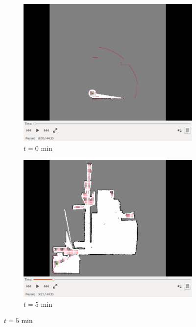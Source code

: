 \documentclass[smallextended]{svjour3}       %
\begin{document}
\begin{figure}[!ht]
    \centering
    \begin{subfigure}[t]{0.3\columnwidth}
        \centering
        \includegraphics[trim = {4.6cm 3.8cm 4.6cm 0}, clip, width=\textwidth]{0min.png}
        \caption{$t=0$ min}
        \label{fig:IRL0min}
    \end{subfigure}
    \begin{subfigure}[t]{0.3\columnwidth}
        \centering
        \includegraphics[trim = {4.6cm 3.8cm 4.6cm 0}, clip, width=\textwidth]{5min.png}
        \caption{$t=5$ min}
        \label{fig:IRL5min}

\end{subfigure}
\end{figure}
\end{document}

